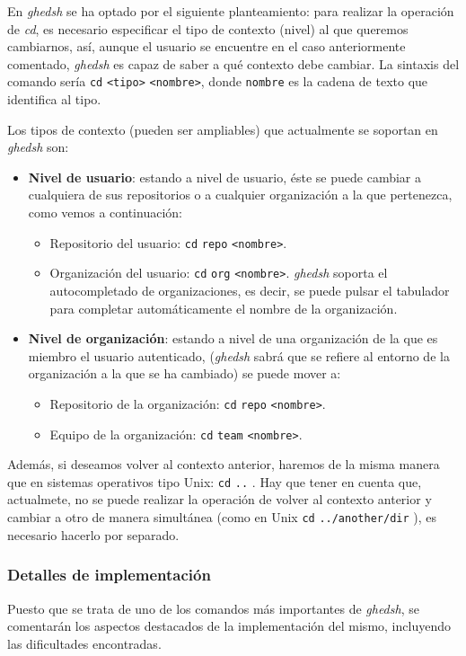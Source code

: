 En {\it ghedsh} se ha optado por el siguiente planteamiento: para realizar la operación de
{\it cd}, es necesario especificar el tipo de contexto (nivel) al que queremos cambiarnos, así, aunque el usuario se encuentre en el caso anteriormente comentado, {\it ghedsh} es capaz de saber a qué contexto debe cambiar.
La sintaxis del comando sería \verb|cd| \verb|<tipo>| \verb|<nombre>|, donde \verb|nombre| es la cadena de texto que identifica al tipo.
\bigskip

Los tipos de contexto (pueden ser ampliables) que actualmente se soportan en {\it ghedsh} son:
\begin{itemize}
	\item \textbf{Nivel de usuario}: estando a nivel de usuario, éste se puede cambiar a cualquiera de sus repositorios o a cualquier organización a la que pertenezca, como vemos a continuación:
		\begin{itemize}
			\item Repositorio del usuario: \verb|cd|  \verb|repo| \verb|<nombre>|.
			\item Organización del usuario: \verb|cd|  \verb|org| \verb|<nombre>|. {\it ghedsh} soporta el autocompletado de organizaciones, es decir, se puede pulsar el tabulador para completar automáticamente el nombre de la organización.
		\end{itemize}
	\item \textbf{Nivel de organización}: estando a nivel de una organización de la que es miembro el usuario autenticado, ({\it ghedsh} sabrá que se refiere al entorno de la organización a la que se ha cambiado) se puede mover a:
		\begin{itemize}
			\item Repositorio de la organización: \verb|cd|  \verb|repo| \verb|<nombre>|.
			\item Equipo de la organización: \verb|cd|  \verb|team| \verb|<nombre>|.
		\end{itemize}
\end{itemize}

Además, si deseamos volver al contexto anterior, haremos de la misma manera que en sistemas operativos tipo Unix: \verb|cd| \verb|..| . Hay que tener en cuenta que, actualmete, no se puede realizar la operación de volver al contexto anterior y cambiar a otro de manera simultánea (como en Unix \verb|cd| \verb|../another/dir| ), es necesario hacerlo por separado.

\subsubsection{Detalles de implementación}
Puesto que se trata de uno de los comandos más importantes de {\it ghedsh}, se comentarán los aspectos destacados de la implementación del mismo, incluyendo las dificultades encontradas.
\bigskip

